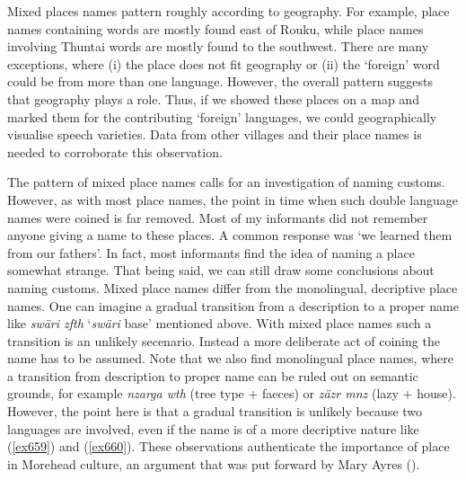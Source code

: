 Mixed places names pattern roughly according to geography. For example, place names containing  words are mostly found east of Rouku, while place names involving  Thuntai words are mostly found to the southwest. There are many exceptions, where (i) the place does not fit geography or (ii) the `foreign' word could be from more than one language. However, the overall pattern suggests that geography plays a role. Thus, if we showed these places on a map and marked them for the contributing `foreign' languages, we could geographically visualise speech varieties. Data from other villages and their place names is needed to corroborate this observation.%

The pattern of mixed place names calls for an investigation of naming customs. However, as with most place names, the point in time when such double language names were coined is far removed. Most of my informants did not remember anyone giving a name to these places. A common response was `we learned them from our fathers'. In fact, most informants find the idea of naming a place somewhat strange. That being said, we can still draw some conclusions about naming customs. Mixed place names differ from the monolingual, decriptive place names. One can imagine a gradual transition from a description to a proper name like \emph{swäri zfth} `\emph{swäri} base' mentioned above. With mixed place names such a transition is an unlikely secenario. Instead a more deliberate act of coining the name has to be assumed. Note that we also find monolingual place names, where a transition from description to proper name can be ruled out on semantic grounds, for example \emph{nzarga wth} (tree type + faeces) or \emph{zäzr mnz} (lazy + house). However, the point here is that a gradual transition is unlikely because two languages are involved, even if the name is of a more decriptive nature like (\ref{ex659}) and (\ref{ex660}). These observations authenticate the importance of place in Morehead culture, an argument that was put forward by Mary Ayres (\citeyear{Ayres:ws}).%

